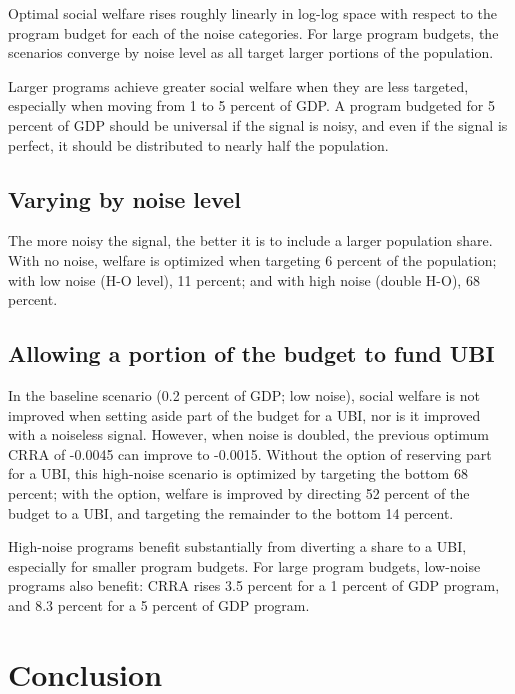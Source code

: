 \documentclass[12pt]{article}
\begin{document}
Optimal social welfare rises roughly linearly in log-log space with respect to 
the program budget for each of the noise categories. For large program budgets, 
the scenarios converge by noise level as all target larger portions of the 
population.


Larger programs achieve greater social welfare when they are less targeted, 
especially when moving from 1 to 5 percent of GDP. A program budgeted for 5 
percent of GDP should be universal if the signal is noisy, and even if the 
signal is perfect, it should be distributed to nearly half the population.


\subsection{Varying by noise level} \label{varying_by_noise}

The more noisy the signal, the better it is to include a larger population 
share. With no noise, welfare is optimized when targeting 6 percent of the 
population; with low noise (H-O level), 11 percent; and with high noise (double 
H-O), 68 percent.


\subsection{Allowing a portion of the budget to fund UBI} \label{ubi_portion}

In the baseline scenario (0.2 percent of GDP; low noise), social welfare is not 
improved when setting aside part of the budget for a UBI, nor is it improved 
with a noiseless signal. However, when noise is doubled, the previous optimum 
CRRA of -0.0045 can improve to -0.0015. Without the option of reserving part 
for a UBI, this high-noise scenario is optimized by targeting the bottom 68 
percent; with the option, welfare is improved by directing 52 percent of the 
budget to a UBI, and targeting the remainder to the bottom 14 percent.

High-noise programs benefit substantially from diverting a share to a UBI, 
especially for smaller program budgets. For large program budgets, low-noise 
programs also benefit: CRRA rises 3.5 percent for a 1 percent of GDP program, 
and 8.3 percent for a 5 percent of GDP program.


\section{Conclusion} \label{sec:conclusion}
\end{document}
